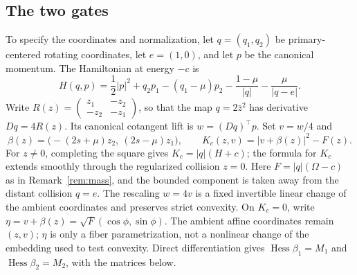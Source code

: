 \documentclass[11pt,reqno]{amsart}
\theoremstyle{plain}
\theoremstyle{definition}
\begin{document}
\subsection{The two gates}\label{sec:gates}

To specify the coordinates and normalization, let $q=(q_1,q_2)$ be
primary-centered rotating coordinates, let $e=(1,0)$, and let $p$ be the
canonical momentum.  The Hamiltonian at energy $-c$ is
\[
 H(q,p)=\frac12|p|^2+q_2p_1-(q_1-\mu)p_2
       -\frac{1-\mu}{|q|}-\frac{\mu}{|q-e|}.
\]
Write $R(z)=\left(\begin{smallmatrix}z_1&-z_2\\-z_2&-z_1\end{smallmatrix}\right)$,
so that the map $q=2\bar z^2$ has derivative $Dq=4R(z)$.
Its canonical cotangent lift is $w=(Dq)^\top p$.
Set $v=w/4$ and
\[
 \beta(z)=\bigl(-(2s+\mu)z_2,\ (2s-\mu)z_1\bigr),
 \qquad K_c(z,v)=|v+\beta(z)|^2-F(z).
\]
For $z\ne0$, completing the square gives
$K_c=|q|(H+c)$; the formula for $K_c$ extends smoothly through
the regularized collision $z=0$.  Here $F=|q|(\Omega-c)$ as in
Remark~\ref{rem:mass}, and the bounded component is taken away from the distant
collision $q=e$.  The rescaling $w=4v$ is a fixed invertible linear
change of the ambient coordinates and preserves strict convexity.
On $K_c=0$, write
$\eta=v+\beta(z)=\sqrt F(\cos\phi,\sin\phi)$.
The ambient affine coordinates remain $(z,v)$; $\eta$ is only a
fiber parametrization, not a nonlinear change of the embedding used to
test convexity.
Direct differentiation gives
$\operatorname{Hess}\beta_1=M_1$ and
$\operatorname{Hess}\beta_2=M_2$, with the matrices below.
\end{document}
